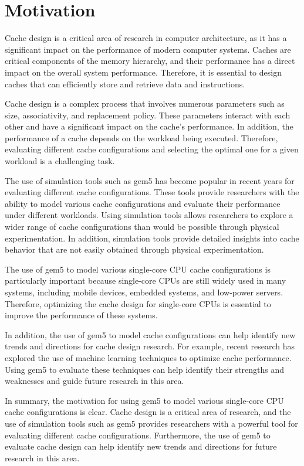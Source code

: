 \documentclass[conference]{IEEEtran}
\begin{document}
\section{Motivation}
Cache design is a critical area of research in computer architecture, as it has a significant impact on the performance of modern computer systems. Caches are critical components of the memory hierarchy, and their performance has a direct impact on the overall system performance. Therefore, it is essential to design caches that can efficiently store and retrieve data and instructions.

Cache design is a complex process that involves numerous parameters such as size, associativity, and replacement policy. These parameters interact with each other and have a significant impact on the cache's performance. In addition, the performance of a cache depends on the workload being executed. Therefore, evaluating different cache configurations and selecting the optimal one for a given workload is a challenging task.

The use of simulation tools such as gem5 has become popular in recent years for evaluating different cache configurations. These tools provide researchers with the ability to model various cache configurations and evaluate their performance under different workloads. Using simulation tools allows researchers to explore a wider range of cache configurations than would be possible through physical experimentation. In addition, simulation tools provide detailed insights into cache behavior that are not easily obtained through physical experimentation.

The use of gem5 to model various single-core CPU cache configurations is particularly important because single-core CPUs are still widely used in many systems, including mobile devices, embedded systems, and low-power servers. Therefore, optimizing the cache design for single-core CPUs is essential to improve the performance of these systems.

In addition, the use of gem5 to model cache configurations can help identify new trends and directions for cache design research. For example, recent research has explored the use of machine learning techniques to optimize cache performance. Using gem5 to evaluate these techniques can help identify their strengths and weaknesses and guide future research in this area.

In summary, the motivation for using gem5 to model various single-core CPU cache configurations is clear. Cache design is a critical area of research, and the use of simulation tools such as gem5 provides researchers with a powerful tool for evaluating different cache configurations. Furthermore, the use of gem5 to evaluate cache design can help identify new trends and directions for future research in this area.
\end{document}
